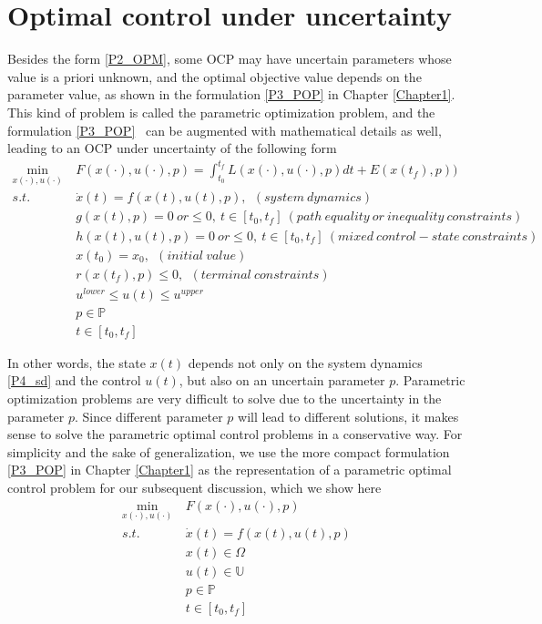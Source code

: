 \documentclass  [
  paper    = a4,
  BCOR     = 10mm,
  twoside,
  fontsize = 12pt,
  fleqn,
  toc      = bibnumbered,
  toc      = listofnumbered,
  numbers  = noendperiod,
  headings = normal,
  listof   = leveldown,
  version  = 3.03
]                                       {scrreprt}
\newcommand{\<}{\langle}
\renewcommand{\>}{\rangle}
\begin{document}
\chapter{Optimal control under uncertainty}
\label{Chapter3}
Besides the form \ref{P2_OPM}, some OCP may have uncertain parameters whose value is a priori unknown, and the optimal objective value depends on the parameter value, as shown in the formulation \ref{P3_POP} in Chapter \ref{Chapter1}. This kind of problem is called the parametric optimization problem, and the formulation \ref{P3_POP}  can be augmented with mathematical details as well, leading to an OCP under uncertainty of the following form
	\begin{subequations}
	\begin{align}
		\underset{x(\cdot), u(\cdot)}{\text{min}}   \ &  F(x(\cdot), u(\cdot), p)  = \int_{t_0}^{t_f}L(x(\cdot), u(\cdot), p)dt + E (x(t_f),p)) \label{P4_cost} \\
		s.t.\ \ &  \dot{x} (t) = f(x(t), u(t), p), \ \ (system \ dynamics)   \label{P4_sd} \\
		& g(x(t), p) = 0 \  or \leq 0, \ t \in [t_0, t_f]\  (path\  equality\ or\ inequality\ constraints)   \label{P4_ec}\\
		&  h(x(t), u(t), p) =0\  or  \leq 0,\ t \in [t_0, t_f] \ (mixed \ control-state  \ constraints)   \label{P4_inc}\\
		& x(t_0) = x_0, \ \ (initial \ value) \\
		& r(x(t_f), p) \leq 0, \ \ (terminal \ constraints)  \label{P4_final} \\
		& u^{lower} \leq u(t) \leq u^{upper}   \label{P4_box_u} \\ 
		& p  \in   \mathbb{P}  \\
		& t \in [t_0, t_f] 
	\end{align}
	\label{P4_OCPPara}
\end{subequations}


In other words, the state $x(t)$ depends not only on the system dynamics \ref{P4_sd} and the control $u(t)$, but also on an uncertain parameter $p$. Parametric optimization problems are very difficult to solve due to the uncertainty in the parameter $p$. Since different parameter $p$ will lead to different solutions, it makes sense to solve the parametric optimal control problems in a conservative way. For simplicity and the sake of generalization, we use the more compact formulation \ref{P3_POP} in Chapter \ref{Chapter1} as the representation of a parametric optimal control problem for our subsequent discussion, which we show here
      \begin{equation}
	\begin{aligned}
	\underset{x(\cdot), u(\cdot)}{\text{min}}  \ &  F(x(\cdot), u(\cdot), p) \\
	s.t.\ \  &  \dot{x} (t) = f(x(t), u(t), p)\\ 
	& x(t) \in \Omega \\
	& u(t) \in \mathbb{U}  \\
	& p  \in   \mathbb{P}  \\
	& t \in [t_0, t_f]
\end{aligned}
	\label{P5_POP}
\end{equation}
\end{document}
